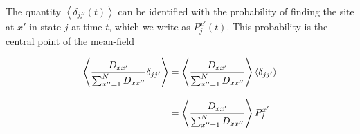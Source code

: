 The quantity $\left< \delta_{jj'}(t) \right>$ can be identified with the probability of finding the site at $x'$ in state $j$ at time
$t$, which we write as $P^{x'}_j(t)$. This probability is the central point of the mean-field

\begin{align}
    \left< \frac{D_{xx'}}{\sum_{x''=1}^ND_{xx''}}\delta_{jj'} \right> &= \left< \frac{D_{xx'}}{\sum_{x''=1}^ND_{xx''}} \right>\left< \delta_{jj'} \right> \notag\\[8pt]
    &= \left< \frac{D_{xx'}}{\sum_{x''=1}^ND_{xx''}} \right> P^{x'}_j
\end{align}
